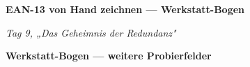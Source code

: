 \documentclass[11pt, a4paper]{scrartcl}
\begin{document}
\textbf{\Large EAN-13 von Hand zeichnen — Werkstatt-Bogen}\par
\smallskip
\textit{Tag 9, „Das Geheimnis der Redundanz"}\par
\bigskip


\vfill
\zeichenfeldcheatsheet

\newpage

\textbf{\Large Werkstatt-Bogen — weitere Probierfelder}\par
\bigskip


\vfill
\zeichenfeldcheatsheet
\end{document}

